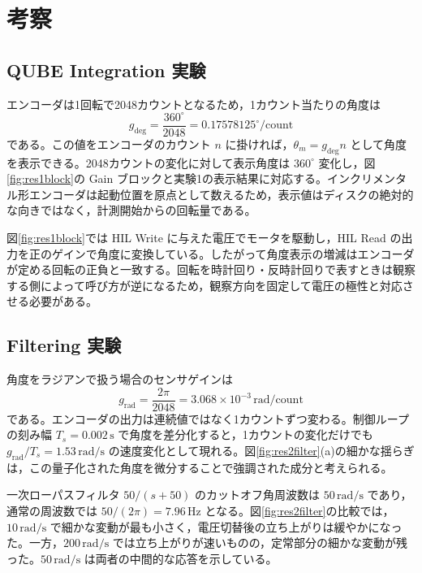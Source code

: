 \clearpage
\section{考察}

\subsection{QUBE Integration 実験}
エンコーダは1回転で2048カウントとなるため，1カウント当たりの角度は
\begin{equation}
 g_{\mathrm{deg}}=\frac{360^{\circ}}{2048}
 =0.17578125^{\circ}/\mathrm{count}
 \label{eq:discgain}
\end{equation}
である。この値をエンコーダのカウント $n$ に掛ければ，$\theta_m=g_{\mathrm{deg}}n$ として角度を表示できる。2048カウントの変化に対して表示角度は $360^{\circ}$ 変化し，図\ref{fig:res1block}の Gain ブロックと実験1の表示結果に対応する。インクリメンタル形エンコーダは起動位置を原点として数えるため，表示値はディスクの絶対的な向きではなく，計測開始からの回転量である。

図\ref{fig:res1block}では HIL Write に与えた電圧でモータを駆動し，HIL Read の出力を正のゲインで角度に変換している。したがって角度表示の増減はエンコーダが定める回転の正負と一致する。回転を時計回り・反時計回りで表すときは観察する側によって呼び方が逆になるため，観察方向を固定して電圧の極性と対応させる必要がある。

\subsection{Filtering 実験}
角度をラジアンで扱う場合のセンサゲインは
\begin{equation}
 g_{\mathrm{rad}}=\frac{2\pi}{2048}
 =3.068\times10^{-3}\,\mathrm{rad/count}
 \label{eq:discrad}
\end{equation}
である。エンコーダの出力は連続値ではなく1カウントずつ変わる。制御ループの刻み幅 $T_s=0.002\,\mathrm{s}$ で角度を差分化すると，1カウントの変化だけでも $g_{\mathrm{rad}}/T_s=1.53\,\mathrm{rad/s}$ の速度変化として現れる。図\ref{fig:res2filter}(a)の細かな揺らぎは，この量子化された角度を微分することで強調された成分と考えられる。

一次ローパスフィルタ $50/(s+50)$ のカットオフ角周波数は $50\,\mathrm{rad/s}$ であり，通常の周波数では $50/(2\pi)=7.96\,\mathrm{Hz}$ となる。図\ref{fig:res2filter}の比較では，$10\,\mathrm{rad/s}$ で細かな変動が最も小さく，電圧切替後の立ち上がりは緩やかになった。一方，$200\,\mathrm{rad/s}$ では立ち上がりが速いものの，定常部分の細かな変動が残った。$50\,\mathrm{rad/s}$ は両者の中間的な応答を示している。

